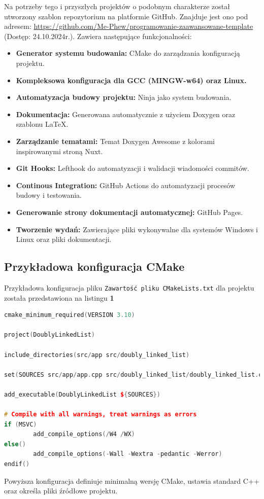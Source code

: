 Na potrzeby tego i przyszłych projektów o podobnym charakterze
został utworzony szablon repozytorium na platformie GitHub.
Znajduje jest ono pod adresem: \url{https://github.com/Me-Phew/programowanie-zaawansowane-template}\cite{GitHubProjectTemplate} (Dostęp: 24.10.2024r.).
Zawiera następujące funkcjonalności:

\begin{itemize}
  \item \textbf{Generator systemu budowania:} CMake do zarządzania konfiguracją projektu.
  \item \textbf{Kompleksowa konfiguracja dla GCC (MINGW-w64) oraz Linux.}
  \item \textbf{Automatyzacja budowy projektu:} Ninja jako system budowania.
  \item \textbf{Dokumentacja:} Generowana automatycznie z użyciem Doxygen oraz szablonu LaTeX.
  \item \textbf{Zarządzanie tematami:} Temat Doxygen Awesome z kolorami inspirowanymi stroną Nuxt.
  \item \textbf{Git Hooks:} Lefthook do automatyzacji i walidacji wiadomości commitów.
  \item \textbf{Continous Integration:} GitHub Actions do automatyzacji procesów budowy i testowania.
  \item \textbf{Generowanie strony dokumentacji automatycznej:} GitHub Pages.
  \item \textbf{Tworzenie wydań:} Zawierające pliki wykonywalne dla systemów Windows i Linux oraz pliki dokumentacji.
\end{itemize}

\newpage

\subsection{Przykładowa konfiguracja CMake}

Przykładowa konfiguracja pliku \texttt{Zawartość pliku CMakeLists.txt} dla projektu została przedstawiona
na listingu \textbf{1}

\begin{lstlisting}[caption=CMakeLists.txt, label={lst:listing-CMakeLists.txt}, language=C++]
cmake_minimum_required(VERSION 3.10)

project(DoublyLinkedList)

include_directories(src/app src/doubly_linked_list)

set(SOURCES src/app/app.cpp src/doubly_linked_list/doubly_linked_list.cpp src/main.cpp)

add_executable(DoublyLinkedList ${SOURCES})

# Compile with all warnings, treat warnings as errors
if (MSVC)
		add_compile_options(/W4 /WX)
else()
		add_compile_options(-Wall -Wextra -pedantic -Werror)
endif()
\end{lstlisting}

Powyższa konfiguracja definiuje minimalną wersję CMake, ustawia standard C++ oraz określa pliki źródłowe projektu.
